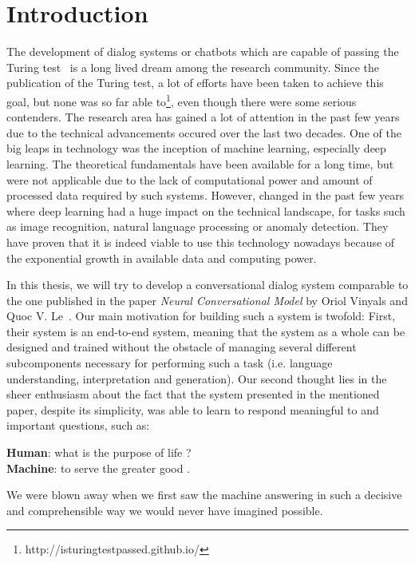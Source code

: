 \chapter{Introduction}
The development of dialog systems or chatbots which are capable of passing the Turing test~\cite{Turing:1950} is a long lived dream among the research community. Since the publication of the Turing test, a lot of efforts have been taken to achieve this goal, but none was so far able to\footnote{http://isturingtestpassed.github.io/}, even though there were some serious contenders. The research area has gained a lot of attention in the past few years due to the technical advancements occured over the last two decades. One of the big leaps in technology was the inception of machine learning, especially deep learning. The theoretical fundamentals have been available for a long time, but were not applicable due to the lack of computational power and amount of processed data required by such systems. However, changed in the past few years where deep learning had a huge impact on the technical landscape, for tasks such as image recognition, natural language processing or anomaly detection. They have proven that it is indeed viable to use this technology nowadays because of the exponential growth in available data and computing power.

In this thesis, we will try to develop a conversational dialog system comparable to the one published in the paper \emph{Neural Conversational Model} by Oriol Vinyals and Quoc V. Le~\cite{Vinyals:2015}. Our main motivation for building such a system is twofold: First, their system is an end-to-end system, meaning that the system as a whole can be designed and trained without the obstacle of managing several different subcomponents necessary for performing such a task (i.e. language understanding, interpretation and generation). Our second thought lies in the sheer enthusiasm about the fact that the system presented in the mentioned paper, despite its simplicity, was able to learn to respond meaningful to and important questions, such as:

\begin{center}	
	\textbf{Human}: what is the purpose of life ?\\
	\textbf{Machine}: to serve the greater good .
\end{center}

We were blown away when we first saw the machine answering in such a decisive and comprehensible way we would never have imagined possible.

